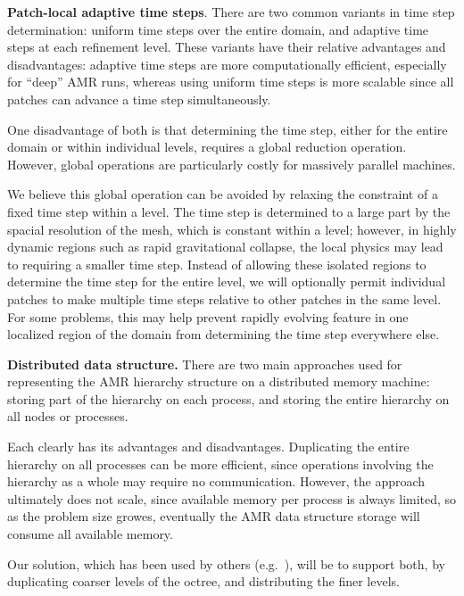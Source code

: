 \documentclass[10pt]{article}
\begin{document}

\textbf{Patch-local adaptive time steps}. There are two common
variants in time step determination: uniform time steps over the
entire domain, and adaptive time steps at each refinement level.
These variants have their relative advantages and disadvantages:
adaptive time steps are more computationally efficient, especially for
``deep'' AMR runs, whereas using uniform time steps is more scalable
since all patches can advance a time step simultaneously.

One disadvantage of both is that determining the time step, either for
the entire domain or within individual levels, requires a global
reduction operation.  However, global operations are particularly costly for
massively parallel machines.  

We believe this global operation can be avoided by relaxing the
constraint of a fixed time step within a level.  The time step is
determined to a large part by the spacial resolution of the mesh,
which is constant within a level; however, in highly dynamic regions
such as rapid gravitational collapse, the local physics may lead to
requiring a smaller time step.  Instead of allowing these isolated
regions to determine the time step for the entire level, we will
optionally permit individual patches to make multiple time steps
relative to other patches in the same level.  For some problems, this
may help prevent rapidly evolving feature in one localized region of
the domain from determining the time step everywhere else.



\textbf{Distributed data structure.} There are two main approaches
used for representing the AMR hierarchy structure on a distributed
memory machine: storing part of the hierarchy on each process, and
storing the entire hierarchy on all nodes or processes.

Each clearly has its advantages and disadvantages.  Duplicating the
entire hierarchy on all processes can be more efficient, since
operations involving the hierarchy as a whole may require no
communication.  However, the approach ultimately does not scale, since
available memory per process is always limited, so as the problem size
growes, eventually the AMR data structure storage will consume all
available memory.

Our solution, which has been used by others
(e.g.~\cite{@@@hybrid-storage}), will be to support both, by
duplicating coarser levels of the octree, and distributing the finer
levels.
\end{document}

